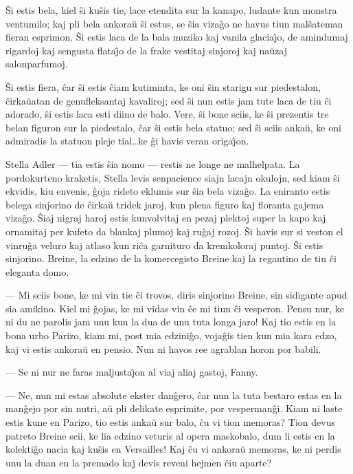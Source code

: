    \^Si estis bela, kiel \^si ku\^sis tie, lace etendita sur la kanapo,
ludante kun monstra ventumilo; kaj pli bela ankora\u u \^si estus,
se \^sia viza\^go ne havus tiun mal\^sateman fieran esprimon. \^Si
estis laca de la bala muziko kaj vanila glacia\^{\j}o, de amindumaj
rigardoj kaj sengusta flata\^{\j}o de la frake vestitaj sinjoroj kaj
na\u uzaj salonparfumoj.

   \^Si estis fiera, \^car \^si estis \^ciam kutiminta, ke oni \^sin starigu
sur piedestalon, \^cirka\u uatan de genufleksantaj kavaliroj; sed
\^si nun estis jam tute laca de tiu \^ci adorado, \^si estis laca
esti diino de balo. Vere, \^si bone sciis, ke \^si prezentis tre
belan figuron sur la piedestalo, \^car \^si estis bela statuo; sed
\^si sciis anka\u u, ke oni admiradis la statuon pleje tial\dots ke
\^gi havis veran origa\^{\j}on.

   Stella Adler --- tia estis \^sia nomo --- restis ne longe ne malhelpata.
La pordokurteno kraketis, Stella levis senpacience siajn lacajn
okulojn, sed kiam \^si ekvidis, kiu envenis, \^goja rideto eklumis
sur \^sia bela viza\^go. La eniranto estis belega sinjorino de
\^cirka\u u tridek jaroj, kun plena figuro kaj floranta gajema
viza\^go. \^Siaj nigraj haroj estis kunvolvitaj en pezaj plektoj
super la kapo kaj ornamitaj per kufeto da blankaj plumoj kaj ru\^gaj
rozoj. \^Si havis sur si veston el vinru\^ga veluro kaj atlaso kun
ri\^ca garnituro da kremkoloraj puntoj. \^Si estis sinjorino.
Breine, la edzino de la komercegisto Breine kaj la regantino de tiu
\^ci eleganta domo.

 --- Mi sciis bone, ke mi vin tie \^ci trovos, diris sinjorino Breine,
sin sidigante apud sia amikino. Kiel mi \^gojas, ke mi vidas vin
\^ce mi tiun \^ci vesperon. Pensu nur, ke ni du ne parolis jam unu
kun la dua de unu tuta longa jaro! Kaj tio estis en la bona urbo
Parizo, kiam mi, post mia edzini\^go, voja\^gis tien kun mia kara
edzo, kaj vi estis ankora\u u en pensio. Nun ni havos ree agrablan
horon por babili.

 --- Se ni nur ne faras maljusta\^{\j}on al viaj aliaj gastoj, Fanny.

 --- Ne, nun mi estas absolute ekster dan\^gero, \^car nun la tuta
bestaro estas en la man\^gejo por sin nutri, a\u u pli delikate
esprimite, por vesperman\^gi. Kiam ni laste estis kune en Parizo,
tio estis anka\u u sur balo, \^cu vi tion memoras? Tion devus
patreto Breine scii, ke lia edzino veturis al opera maskobalo, dum
li estis en la kolekti\^go nacia kaj ku\^sis en Versailles! Kaj \^cu
vi ankora\u u memoras, ke ni perdis unu la duan en la premado kaj
devis reveni hejmen \^ciu aparte?

